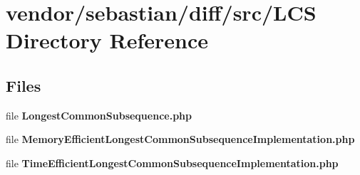 \section{vendor/sebastian/diff/src/\+L\+C\+S Directory Reference}
\label{dir_b25b6cb3e8e8aec14e9cbf2866d95d44}
\subsection*{Files}
\begin{DoxyCompactItemize}
\item 
file {\bf Longest\+Common\+Subsequence.\+php}
\item 
file {\bf Memory\+Efficient\+Longest\+Common\+Subsequence\+Implementation.\+php}
\item 
file {\bf Time\+Efficient\+Longest\+Common\+Subsequence\+Implementation.\+php}
\end{DoxyCompactItemize}
